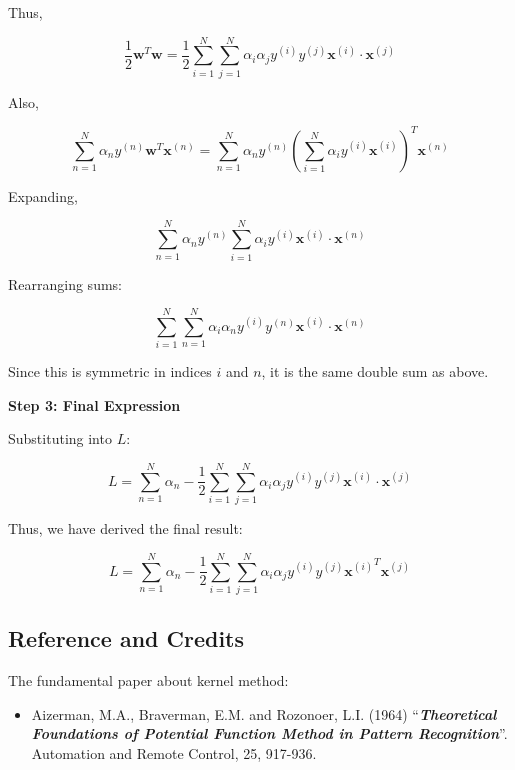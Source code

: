 \documentclass[11pt]{article}
\makeatletter
\providecommand{\tightlist}{%
      \setlength{\itemsep}{0pt}\setlength{\parskip}{0pt}}
\newcommand{\boxspacing}{\kern\kvtcb@left@rule\kern\kvtcb@boxsep}
\newcommand{\prompt}[4]{
        {\ttfamily\llap{{\color{#2}[#3]:\hspace{3pt}#4}}\vspace{-\baselineskip}}
    }
\makeatother
\begin{document}
Thus,

$$
\frac{1}{2} \mathbf{w}^T \mathbf{w} = \frac{1}{2} \sum\limits_{i=1}^N \sum\limits_{j=1}^N \alpha_i \alpha_j y^{(i)} y^{(j)} \mathbf{x}^{(i)} \cdot \mathbf{x}^{(j)}
$$

Also,

$$
\sum\limits_{n=1}^N \alpha_n y^{(n)} \mathbf{w}^T \mathbf{x}^{(n)} = \sum\limits_{n=1}^N \alpha_n y^{(n)} \left( \sum\limits_{i=1}^N \alpha_i y^{(i)} \mathbf{x}^{(i)} \right)^T \mathbf{x}^{(n)}
$$

Expanding,

$$
\sum\limits_{n=1}^N \alpha_n y^{(n)} \sum\limits_{i=1}^N \alpha_i y^{(i)} \mathbf{x}^{(i)} \cdot \mathbf{x}^{(n)}
$$

Rearranging sums:

$$
\sum\limits_{i=1}^N \sum\limits_{n=1}^N \alpha_i \alpha_n y^{(i)} y^{(n)} \mathbf{x}^{(i)} \cdot \mathbf{x}^{(n)}
$$

Since this is symmetric in indices $ i $ and $ n $, it is the same
double sum as above.

\textbf{Step 3: Final Expression}

Substituting into $ L $:

$$
L = \sum\limits_{n=1}^N \alpha_n - \frac{1}{2} \sum\limits_{i=1}^N \sum\limits_{j=1}^N \alpha_i \alpha_j y^{(i)} y^{(j)} \mathbf{x}^{(i)} \cdot \mathbf{x}^{(j)}
$$

Thus, we have derived the final result:

$$
L = \sum\limits_{n=1}^N \alpha_n - \frac{1}{2} \sum\limits_{i=1}^N \sum\limits_{j=1}^N \alpha_i \alpha_j y^{(i)} y^{(j)} {\mathbf{x}^{(i)}}^T \mathbf{x}^{(j)}
$$

    \subsection{Reference and Credits}\label{reference-and-credits}

    The fundamental paper about kernel method:

\begin{itemize}
\tightlist
\item
  Aizerman, M.A., Braverman, E.M. and Rozonoer, L.I. (1964)
  ``\textbf{\emph{Theoretical Foundations of Potential Function Method
  in Pattern Recognition}}''. Automation and Remote Control, 25,
  917-936.
\end{itemize}

    \begin{tcolorbox}[breakable, size=fbox, boxrule=1pt, pad at break*=1mm,colback=cellbackground, colframe=cellborder]
\prompt{In}{incolor}{ }{\boxspacing}
\begin{Verbatim}[commandchars=\\\{\}]

\end{Verbatim}
\end{tcolorbox}


    
    
    
\end{document}
